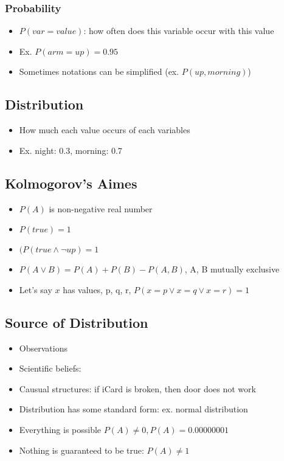     \subsubsection{Probability}

      \begin{itemize}
        \item $ P(var = value) $: how often does this variable occur with this value
        \item Ex. $ P(arm = up) = 0.95 $
        \item Sometimes notations can be simplified (ex. $ P(up, morning) $)
      \end{itemize}

    \subsection{Distribution}

      \begin{itemize}
        \item How much each value occurs of each variables
        \item Ex. night: 0.3, morning: 0.7
      \end{itemize}

    \subsection{Kolmogorov's Aimes}

      \begin{itemize}
        \item $ P(A) $ is non-negative real number
        \item $ P(true) = 1 $
        \item $ (P(true \land \neg up) = 1 $
        \item $ P(A \lor B) = P(A) + P(B) - P(A, B) $, A, B mutually exclusive
        \item Let's say $ x $ has values, p, q, r, $ P(x = p \lor x = q \lor x = r) = 1 $
      \end{itemize}

    \subsection{Source of Distribution}

      \begin{itemize}
        \item Observations
        \item Scientific beliefs:
        \item Causual structures: if iCard is broken, then door does not work
        \item Distribution has some standard form: ex. normal distribution
        \item Everything is possible $ P(A) \ne 0, P(A) = 0.00000001 $
        \item Nothing is guaranteed to be true: $ P(A) \ne 1 $
      \end{itemize}

